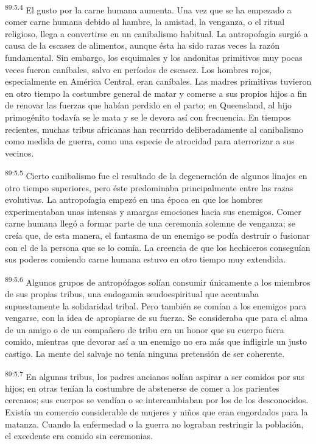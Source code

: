 \par
\textsuperscript{89:5.4} El gusto por la carne humana aumenta. Una vez que se ha empezado a comer carne humana debido al hambre, la amistad, la venganza, o el ritual religioso, llega a convertirse en un canibalismo habitual. La antropofagia surgió a causa de la escasez de alimentos, aunque ésta ha sido raras veces la razón fundamental. Sin embargo, los esquimales y los andonitas primitivos muy pocas veces fueron caníbales, salvo en períodos de escasez. Los hombres rojos, especialmente en América Central, eran caníbales. Las madres primitivas tuvieron en otro tiempo la costumbre general de matar y comerse a sus propios hijos a fin de renovar las fuerzas que habían perdido en el parto; en Queensland, al hijo primogénito todavía se le mata y se le devora así con frecuencia. En tiempos recientes, muchas tribus africanas han recurrido deliberadamente al canibalismo como medida de guerra, como una especie de atrocidad para aterrorizar a sus vecinos.

\par
\textsuperscript{89:5.5} Cierto canibalismo fue el resultado de la degeneración de algunos linajes en otro tiempo superiores, pero éste predominaba principalmente entre las razas evolutivas. La antropofagia empezó en una época en que los hombres experimentaban unas intensas y amargas emociones hacia sus enemigos. Comer carne humana llegó a formar parte de una ceremonia solemne de venganza; se creía que, de esta manera, el fantasma de un enemigo se podía destruir o fusionar con el de la persona que se lo comía. La creencia de que los hechiceros conseguían sus poderes comiendo carne humana estuvo en otro tiempo muy extendida.

\par
\textsuperscript{89:5.6} Algunos grupos de antropófagos solían consumir únicamente a los miembros de sus propias tribus, una endogamia seudoespiritual que acentuaba supuestamente la solidaridad tribal. Pero también se comían a los enemigos para vengarse, con la idea de apropiarse de su fuerza. Se consideraba que para el alma de un amigo o de un compañero de tribu era un honor que su cuerpo fuera comido, mientras que devorar así a un enemigo no era más que infligirle un justo castigo. La mente del salvaje no tenía ninguna pretensión de ser coherente.

\par
\textsuperscript{89:5.7} En algunas tribus, los padres ancianos solían aspirar a ser comidos por sus hijos; en otras tenían la costumbre de abstenerse de comer a los parientes cercanos; sus cuerpos se vendían o se intercambiaban por los de los desconocidos. Existía un comercio considerable de mujeres y niños que eran engordados para la matanza. Cuando la enfermedad o la guerra no lograban restringir la población, el excedente era comido sin ceremonias.


